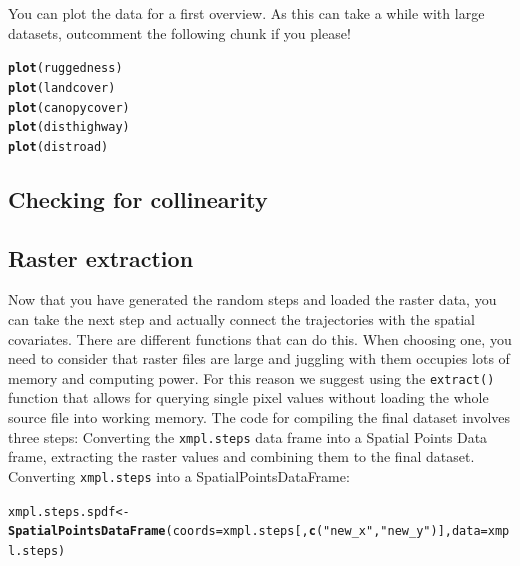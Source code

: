 \documentclass[11pt, a4paper]{article}\usepackage[]{graphicx}\usepackage[]{color}
\makeatletter
\newcommand{\hlstr}[1]{\textcolor[rgb]{0.192,0.494,0.8}{#1}}%
\newcommand{\hlstd}[1]{\textcolor[rgb]{0.345,0.345,0.345}{#1}}%
\newcommand{\hlkwb}[1]{\textcolor[rgb]{0.69,0.353,0.396}{#1}}%
\newcommand{\hlkwc}[1]{\textcolor[rgb]{0.333,0.667,0.333}{#1}}%
\newcommand{\hlkwd}[1]{\textcolor[rgb]{0.737,0.353,0.396}{\textbf{#1}}}%
\newenvironment{kframe}{%
 \def\at@end@of@kframe{}%
 \ifinner\ifhmode%
  \def\at@end@of@kframe{\end{minipage}}%
  \begin{minipage}{\columnwidth}%
 \fi\fi%
 \def\FrameCommand##1{\hskip\@totalleftmargin \hskip-\fboxsep
 \colorbox{shadecolor}{##1}\hskip-\fboxsep
     \hskip-\linewidth \hskip-\@totalleftmargin \hskip\columnwidth}%
 \MakeFramed {\advance\hsize-\width
   \@totalleftmargin\z@ \linewidth\hsize
   \@setminipage}}%
 {\par\unskip\endMakeFramed%
 \at@end@of@kframe}
\newenvironment{knitrout}{}{} %
\makeatother
\begin{document}
You can plot the data for a first overview. As this can take a while with large datasets, outcomment the following chunk if you please!
\begin{knitrout}
\color{fgcolor}\begin{kframe}
\begin{alltt}
\hlkwd{plot}\hlstd{(ruggedness)}
\hlkwd{plot}\hlstd{(landcover)}
\hlkwd{plot}\hlstd{(canopycover)}
\hlkwd{plot}\hlstd{(disthighway)}
\hlkwd{plot}\hlstd{(distroad)}
\end{alltt}
\end{kframe}
\end{knitrout}

\subsection{Checking for collinearity}

\subsection{Raster extraction}
Now that you have generated the random steps and loaded the raster data, you can take the next step and actually connect the trajectories with the spatial covariates. There are different functions that can do this. When choosing one, you need to consider that raster files are large and juggling with them occupies lots of memory and computing power. For this reason we suggest using the \texttt{extract()} function that allows for querying single pixel values without loading the whole source file into working memory. The code for compiling the final dataset involves three steps: Converting the \texttt{xmpl.steps} data frame into a Spatial Points Data frame, extracting the raster values and combining them to the final dataset.
Converting \texttt{xmpl.steps} into a SpatialPointsDataFrame:
\begin{knitrout}
\color{fgcolor}\begin{kframe}
\begin{alltt}
\hlstd{xmpl.steps.spdf} \hlkwb{<-} \hlkwd{SpatialPointsDataFrame}\hlstd{(}\hlkwc{coords} \hlstd{= xmpl.steps[,}\hlkwd{c}\hlstd{(}\hlstr{"new_x"}\hlstd{,}\hlstr{"new_y"}\hlstd{)],} \hlkwc{data} \hlstd{= xmpl.steps)}
\end{alltt}
\end{kframe}
\end{knitrout}
\end{document}
